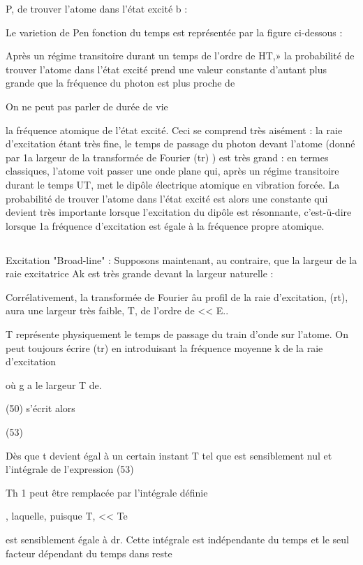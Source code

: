 P, de trouver l'atome dans l'état excité b :

Le varietion de Pen fonction du temps est représentée par la figure ci-dessous :

Après un régime transitoire durant un temps de l'ordre de
HT,» la probabilité de trouver l'atome dans l'état excité prend une valeur
constante d'autant plus grande que la fréquence du photon est plus proche de

 On ne peut pas parler de durée de vie



la fréquence atomique
de l'état excité.
Ceci se comprend très aisément : la raie d'excitation étant
très fine, le temps de passage du photon devant l'atome (donné par 1a largeur
de la transformée de Fourier  (tr) ) est très grand : en termes classiques,
l'atome voit passer une onde plane qui, après un régime transitoire durant le
temps UT, met le dipôle électrique atomique en vibration forcée. La probabilité de trouver l'atome dans l'état excité est alors une constante qui devient
très importante lorsque l'excitation du dipôle est résonnante, c'est-ü-dire
lorsque 1a fréquence d'excitation est égale à la fréquence propre atomique.
\subsection{} Excitation "Broad-line" :%
Supposons maintenant, au contraire, que la largeur de la raie
excitatrice Ak est très grande devant la largeur naturelle :

Corrélativement, la transformée de Fourier âu profil de la raie
d'excitation, (rt), aura une largeur très faible, T, de l'ordre de  << E..

T représente physiquement le temps de passage du train d'onde sur l'atome.
On peut toujours écrire  (tr) en introduisant la fréquence
moyenne k de la raie d'excitation

où g a le largeur T de.

(50) s'écrit alors

(53)

Dès que t devient égal à un certain instant T tel que
 est sensiblement nul et l'intégrale de l'expression (53)



Th 1
peut être remplacée par l'intégrale définie

, laquelle, puisque T, << Te

est sensiblement égale à
dr. Cette intégrale est indépendante
du temps et le seul facteur dépendant du temps dans reste

